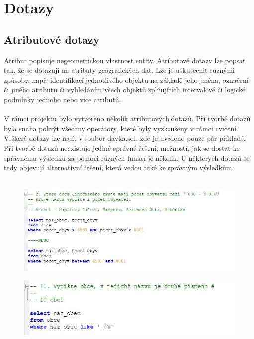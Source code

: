 \documentclass[a4paper, 12pt]{article}
\begin{document}
\section{Dotazy}

\subsection{Atributové dotazy}
Atribut popisuje negeometrickou vlastnost entity. Atributové dotazy lze popsat tak, že se dotazují na atributy geografických dat. Lze je uskutečnit různými způsoby, např. identifikací jednotlivého objektu na základě jeho jména, označení či jiného atributu či vyhledáním všech objektů splňujících intervalové či logické podmínky jednoho nebo více atributů. \\
\\
V rámci projektu bylo vytvořeno několik atributových dotazů. Při tvorbě dotazů byla snaha pokrýt všechny operátory, které byly vyzkoušeny v rámci cvičení. Veškeré dotazy lze najít v soubor davka.sql, zde je uvedeno pouze pár příkladů. Při tvorbě dotazů neexistuje jediné správné řešení, možností, jak se dostat ke správnému výsledku za pomoci různých funkcí je několik. U některých dotazů se tedy objevují alternativní řešení, která vedou také ke správným výsledkům. \\
\\

\begin{figure}[h!]
	\centering
	\includegraphics[width=15cm]{pictures/at1.jpg}
\end{figure}

\begin{figure}[h!]
	\centering
	\includegraphics[width=15cm]{pictures/at2.jpg}
\end{figure}
\end{document}
